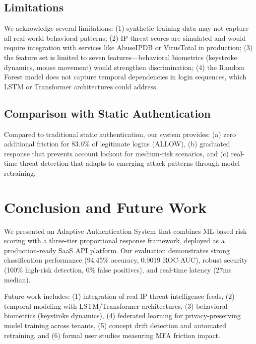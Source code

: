 \documentclass[conference]{IEEEtran}
\begin{document}
\subsection{Limitations}

We acknowledge several limitations: (1) synthetic training data may not capture all real-world behavioral patterns; (2) IP threat scores are simulated and would require integration with services like AbuseIPDB or VirusTotal in production; (3) the feature set is limited to seven features---behavioral biometrics (keystroke dynamics, mouse movement) would strengthen discrimination; (4) the Random Forest model does not capture temporal dependencies in login sequences, which LSTM or Transformer architectures could address.

\subsection{Comparison with Static Authentication}

Compared to traditional static authentication, our system provides: (a) zero additional friction for 83.6\% of legitimate logins (ALLOW), (b) graduated response that prevents account lockout for medium-risk scenarios, and (c) real-time threat detection that adapts to emerging attack patterns through model retraining.

\section{Conclusion and Future Work}

We presented an Adaptive Authentication System that combines ML-based risk scoring with a three-tier proportional response framework, deployed as a production-ready SaaS API platform. Our evaluation demonstrates strong classification performance (94.45\% accuracy, 0.9019 ROC-AUC), robust security (100\% high-risk detection, 0\% false positives), and real-time latency (27ms median).

Future work includes: (1) integration of real IP threat intelligence feeds, (2) temporal modeling with LSTM/Transformer architectures, (3) behavioral biometrics (keystroke dynamics), (4) federated learning for privacy-preserving model training across tenants, (5) concept drift detection and automated retraining, and (6) formal user studies measuring MFA friction impact.
\end{document}
